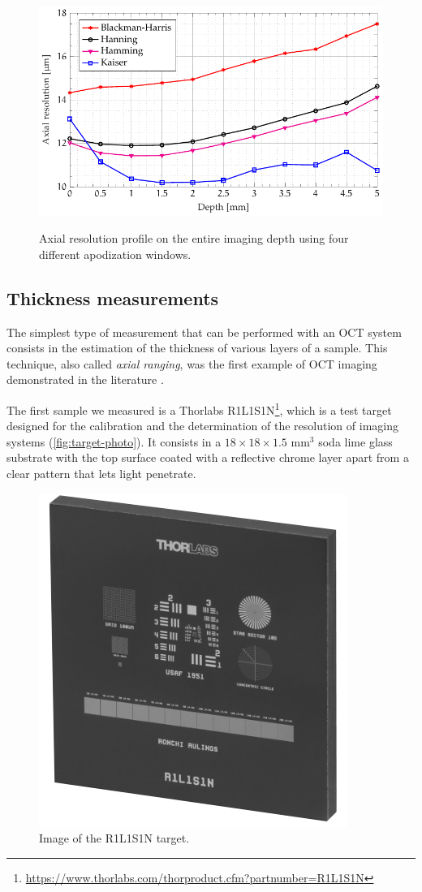 \begin{figure}[hbt]
	\myfloatalign
	{\includegraphics[width=0.8\linewidth]{gfx/ch3/risoluzione-profondita}}
	\caption{Axial resolution profile on the entire imaging depth using four different apodization windows.}\label{fig:axial-resolution-depth}
\end{figure}


\subsection{Thickness measurements}\label{sub:thickness-measurements}
The simplest type of measurement that can be performed with an OCT system consists in the estimation of the thickness of various layers of a sample. This technique, also called \emph{axial ranging}, was the first example of OCT imaging demonstrated in the literature \cite{Fujimoto1986}. 

The first sample we measured is a Thorlabs R1L1S1N\footnote{\url{https://www.thorlabs.com/thorproduct.cfm?partnumber=R1L1S1N}}, which is a test target designed for the calibration and the determination of the resolution of imaging systems (\autoref{fig:target-photo}). It consists in a $18\times18\times1.5$ mm$^3$ soda lime glass substrate with the top surface coated with a reflective chrome layer apart from a clear pattern that lets light penetrate. 


\begin{figure}
	\myfloatalign
	\includegraphics[width=0.3\linewidth]{gfx/ch3/target}
	\caption{Image of the R1L1S1N target.}\label{fig:target-photo}
\end{figure}


